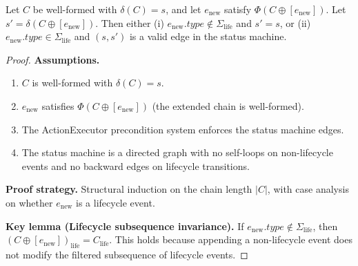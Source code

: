 \begin{theorem}\label{thm:monotonicity-status}
Let $C$ be well-formed with $\delta(C) = s$, and let $e_{\text{new}}$ satisfy $\Phi(C \oplus [e_{\text{new}}])$. Let $s' = \delta(C \oplus [e_{\text{new}}])$. Then either (i) $e_{\text{new}}.\textit{type} \notin \Sigma_{\text{life}}$ and $s' = s$, or (ii) $e_{\text{new}}.\textit{type} \in \Sigma_{\text{life}}$ and $(s, s')$ is a valid edge in the status machine.
\end{theorem}

\begin{proof}
\textbf{Assumptions.}
\begin{enumerate}[label=(A\arabic*),leftmargin=2em]
    \item $C$ is well-formed with $\delta(C) = s$.
    \item $e_{\text{new}}$ satisfies $\Phi(C \oplus [e_{\text{new}}])$ (the extended chain is well-formed).
    \item The ActionExecutor precondition system enforces the status machine edges.
    \item The status machine is a directed graph with no self-loops on non-lifecycle events and no backward edges on lifecycle transitions.
\end{enumerate}

\textbf{Proof strategy.} Structural induction on the chain length $|C|$, with case analysis on whether $e_{\text{new}}$ is a lifecycle event.

\textbf{Key lemma (Lifecycle subsequence invariance).} If $e_{\text{new}}.\textit{type} \notin \Sigma_{\text{life}}$, then $(C \oplus [e_{\text{new}}])_{\text{life}} = C_{\text{life}}$. This holds because appending a non-lifecycle event does not modify the filtered subsequence of lifecycle events.


\end{proof}
